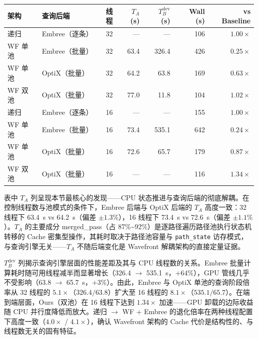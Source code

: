\begin{table}[htbp]
  \centering
  \label{tab:wf-embree-ablation}
  \small
  \begin{tabular}{llrrrrr}
    \toprule
    架构 & 查询后端 & 线程 & $T_A$ (s) & $T_B^{\text{dev}}$ (s) & Wall (s) & vs Baseline \\
    \midrule
    递归 & Embree（逐条）     & 32 & —    & —     & 106 & $1.00\times$ \\
    WF 单池 & Embree（批量） & 32 & 63.4 & 326.4 & 426 & $0.25\times$ \\
    WF 单池 & OptiX（批量）  & 32 & 64.2 & 63.8  & 169 & $0.63\times$ \\
    WF 双池 & OptiX（批量）  & 32 & 77.0 & 11.8  & 104 & $1.02\times$ \\
    \midrule
    递归 & Embree（逐条）     & 16 & —    & —     & 155 & $1.00\times$ \\
    WF 单池 & Embree（批量） & 16 & 73.4 & 535.1 & 642 & $0.24\times$ \\
    WF 单池 & OptiX（批量）  & 16 & 72.6 & 65.7  & 179 & $0.87\times$ \\
    WF 双池 & OptiX（批量）  & 16 & —    & —     & 116 & $1.34\times$ \\
    \bottomrule
  \end{tabular}
\end{table}

表中 $T_A$ 列呈现本节最核心的发现——CPU 状态推进与查询后端的彻底解耦。在控制线程数与池模式的条件下，Embree 后端与 OptiX 后端的 $T_A$ 高度一致：32 线程下 63.4~s vs 64.2~s（偏差 $\pm 1.3\%$），16 线程下 73.4~s vs 72.6~s（偏差 $\pm 1.1\%$）。$T_A$ 的主要成分 merged\_pass（占 87\%\textasciitilde 92\%）是逐路径遍历路径池执行状态机转移的 Cache 密集型操作，其耗时取决于路径池容量与 \texttt{path\_state} 访存模式，与查询引擎无关——$T_A$ 不随后端变化是 Wavefront 解耦架构的直接定量证据。

$T_B^{\text{dev}}$ 列揭示查询引擎层面的性能差距及其与 CPU 线程数的关系。Embree 批量计算耗时随可用线程减半而显著增长（326.4 $\to$ 535.1~s，$+64\%$），GPU 管线几乎不受影响（63.8 $\to$ 65.7~s，$+3\%$）。由此，Embree 与 OptiX 单池的查询阶段倍率从 32 线程的 $5.1\times$（$326.4/63.8$）扩大至 16 线程的 $8.1\times$（$535.1/65.7$）。在端到端层面，Ours（双池）在 16 线程下达到 $1.34\times$ 加速——GPU 卸载的边际收益随 CPU 并行度降低而放大。递归 $\to$ WF + Embree 的退化倍率在两种线程配置下高度一致（$4.0\times$ / $4.1\times$），确认 Wavefront 架构的 Cache 代价是结构性的、与线程数无关的固有特征。

